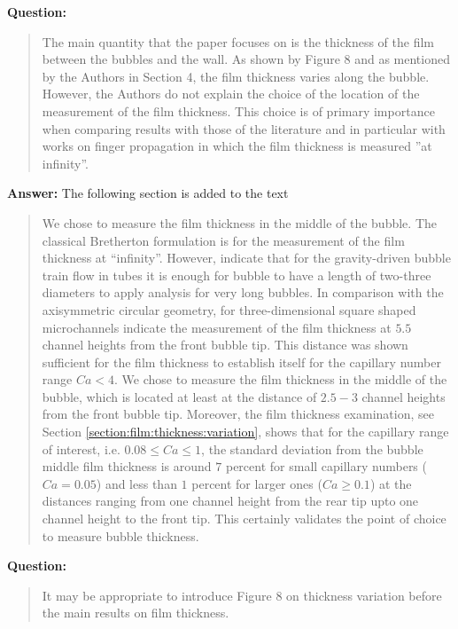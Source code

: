\documentclass{article}
\begin{document}
\textbf{Question:}
\begin{quotation}
The main quantity that the paper focuses on is the thickness of the film between the bubbles and the
wall. As shown by Figure 8 and as mentioned by the Authors in Section 4, the film thickness varies
along the bubble. However, the Authors do not explain the choice of the location of the measurement
of the film thickness. This choice is of primary importance when comparing results with those of
the
literature and in particular with works on finger propagation in which the film thickness is
measured
”at infinity”.
\end{quotation}

\textbf{Answer:} The following section is added to the text 
\begin{quotation}
We chose to measure the film thickness in the middle of the bubble. The
classical Bretherton formulation is for the measurement of the film thickness at ``infinity''.
However, \citet{cerro-bubble-train} indicate that for the gravity-driven bubble train flow in tubes
it is enough for bubble to have a length of two-three diameters to apply analysis for very long
bubbles. In comparison with the axisymmetric circular geometry, for three-dimensional square shaped
microchannels \citet{heil-threedim} indicate the measurement of the film thickness at $5.5$
channel heights from the front bubble tip. This distance was shown sufficient for the
film thickness to establish itself for the capillary number range $Ca<4$. We chose to measure
the film thickness in the middle of the bubble, which is located at least at the distance of $2.5-3$
channel heights from the front bubble tip.  Moreover, the film thickness examination, see Section
\ref{section:film:thickness:variation}, shows that for the capillary range of interest, i.e.
$0.08\leq Ca \leq 1$, the standard deviation from the bubble middle film thickness is around $7$
 percent for small capillary numbers ($Ca=0.05$) and less than $1$ percent for larger ones
($Ca \geq 0.1$) at the distances ranging from one channel height from the rear tip upto one channel
height to the front tip. This certainly validates the point of choice to measure bubble thickness.
\end{quotation}
 
\textbf{Question:}
\begin{quotation}
It may be appropriate to introduce Figure 8 on thickness variation before the main results on ﬁlm
thickness.
\end{quotation}
\end{document}
